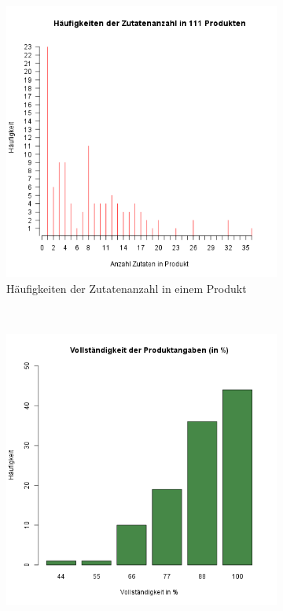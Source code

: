 \begin{figure}[ht]
	\begin{adjustwidth}{-1in}{-1in}
	\centering
	\begin{subfigure}[b]{0.6\textwidth}
		
\includegraphics[width=\textwidth]{misc/r/products_ingredients.png}
		\caption{Häufigkeiten der Zutatenanzahl in einem Produkt}
		\label{img:products_ingredients}
	\end{subfigure}
	~
	\begin{subfigure}[b]{0.6\textwidth}
		\includegraphics[width=\textwidth]{misc/r/integrity.png}

\end{subfigure}
\end{adjustwidth}
\end{figure}
